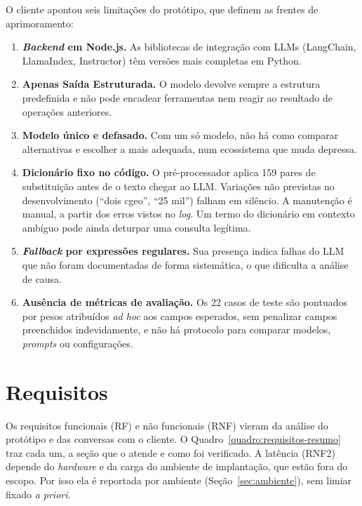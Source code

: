 O cliente apontou seis limitações do protótipo, que definem as frentes de aprimoramento:
\begin{enumerate}
  \item \textbf{\textit{Backend} em Node.js.} As bibliotecas de integração com LLMs (LangChain, LlamaIndex, Instructor) têm versões mais completas em Python.
  \item \textbf{Apenas Saída Estruturada.} O modelo devolve sempre a estrutura predefinida e não pode encadear ferramentas nem reagir ao resultado de operações anteriores.
  \item \textbf{Modelo único e defasado.} Com um só modelo, não há como comparar alternativas e escolher a mais adequada, num ecossistema que muda depressa.
  \item \textbf{Dicionário fixo no código.} O pré-processador aplica 159 pares de substituição antes de o texto chegar ao LLM. Variações não previstas no desenvolvimento (``dois cgeo'', ``25 mil'') falham em silêncio. A manutenção é manual, a partir dos erros vistos no \textit{log}. Um termo do dicionário em contexto ambíguo pode ainda deturpar uma consulta legítima.
  \item \textbf{\textit{Fallback} por expressões regulares.} Sua presença indica falhas do LLM que não foram documentadas de forma sistemática, o que dificulta a análise de causa.
  \item \textbf{Ausência de métricas de avaliação.} Os 22 casos de teste são pontuados por pesos atribuídos \textit{ad hoc} aos campos esperados, sem penalizar campos preenchidos indevidamente, e não há protocolo para comparar modelos, \textit{prompts} ou configurações.
\end{enumerate}

\section{Requisitos}
\label{sec:requisitos}
\label{sec:requisitos-resumo}

Os requisitos funcionais (RF) e não funcionais (RNF) vieram da análise do protótipo e das conversas com o cliente. O Quadro~\ref{quadro:requisitos-resumo} traz cada um, a seção que o atende e como foi verificado. A latência (RNF2) depende do \textit{hardware} e da carga do ambiente de implantação, que estão fora do escopo. Por isso ela é reportada por ambiente (Seção~\ref{sec:ambiente}), sem limiar fixado \textit{a priori}.


